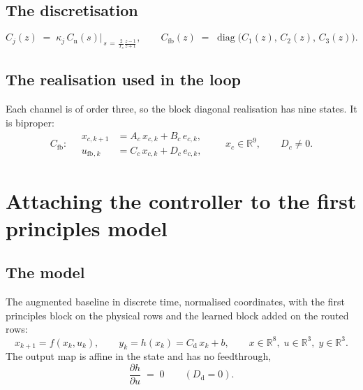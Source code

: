 \documentclass[11pt]{article}
\newcommand{\R}{\mathbb{R}}
\newcommand{\diag}{\operatorname{diag}}
\newcommand{\Cfb}{C_{\mathrm{fb}}}
\newcommand{\Cnorm}{C_{\mathrm{n}}}
\newcommand{\ufb}{u_{\mathrm{fb}}}
\begin{document}
\subsection{The discretisation}

\begin{equation}
  C_j(z) \;=\; \kappa_j\,\Cnorm(s)\Bigr|_{\,s \,=\, \frac{2}{T_s}\frac{z-1}{z+1}} ,
  \qquad
  \Cfb(z) \;=\; \diag\bigl(C_1(z),\, C_2(z),\, C_3(z)\bigr) .
  \label{eq:cfb}
\end{equation}

\subsection{The realisation used in the loop}

Each channel is of order three, so the block diagonal realisation has nine states. It is
biproper:
\begin{equation}
  \Cfb : \quad
  \begin{aligned}
    x_{c,k+1} &= A_c\,x_{c,k} + B_c\,e_{c,k} , \\
    \ufb{}_{,k}   &= C_c\,x_{c,k} + D_c\,e_{c,k} ,
  \end{aligned}
  \qquad
  x_c \in \R^{9} , \qquad D_c \neq 0 .
  \label{eq:cfbss}
\end{equation}

\section{Attaching the controller to the first principles model}
\label{sec:attach}

\subsection{The model}

The augmented baseline in discrete time, normalised coordinates, with the first principles block
on the physical rows and the learned block added on the routed rows:
\begin{equation}
  x_{k+1} = f(x_k, u_k) ,
  \qquad
  y_k = h(x_k) = C_{\mathrm{d}}\,x_k + b ,
  \qquad
  x \in \R^{8},\; u \in \R^{3},\; y \in \R^{3} .
  \label{eq:model}
\end{equation}
The output map is affine in the state and has no feedthrough,
\begin{equation}
  \frac{\partial h}{\partial u} \;=\; 0
  \qquad (D_{\mathrm{d}} = 0) .
  \label{eq:Dd}
\end{equation}
\end{document}
